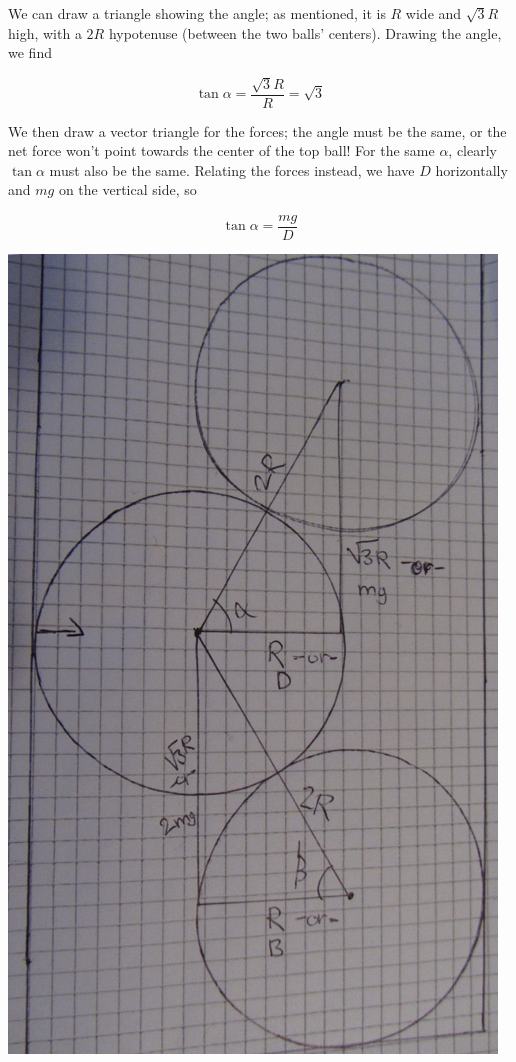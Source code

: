 \documentclass[8.01x]{subfiles}
\begin{document}
We can draw a triangle showing the angle; as mentioned, it is $R$ wide and $\sqrt{3} R$ high, with a $2 R$ hypotenuse (between the two balls' centers). Drawing the angle, we find

\begin{equation}
\tan \alpha = \frac{\sqrt{3}R}{R} = \sqrt{3}
\end{equation}

We then draw a vector triangle for the forces; the angle must be the same, or the net force won't point towards the center of the top ball! For the same $\alpha$, clearly $\tan \alpha$ must also be the same. Relating the forces instead, we have $D$ horizontally and $m g$ on the vertical side, so

\begin{equation}
\tan \alpha = \frac{m g}{D}
\end{equation}

\begin{center}
\includegraphics[scale=0.7]{Graphics/h9p7-sol}
\end{center}
\end{document}
